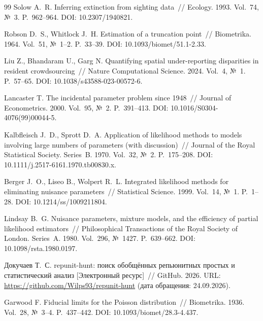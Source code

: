 \documentclass[11pt,a4paper]{article}
\theoremstyle{plain}
\theoremstyle{remark}
\begin{document}
\begin{thebibliography}{99}
 Solow A.~R. Inferring extinction from sighting data~//
Ecology. 1993. Vol.~74, №~3. P.~962--964. DOI: 10.2307/1940821.

 Robson D.~S., Whitlock J.~H. Estimation of a
truncation point~// Biometrika. 1964. Vol.~51, №~1--2. P.~33--39.
DOI: 10.1093/biomet/51.1-2.33.

 Liu Z., Bhandaram U., Garg N. Quantifying spatial
under-reporting disparities in resident crowdsourcing~// Nature Computational
Science. 2024. Vol.~4, №~1. P.~57--65. DOI: 10.1038/s43588-023-00572-6.

 Lancaster T. The incidental parameter problem since
1948~// Journal of Econometrics. 2000. Vol.~95, №~2. P.~391--413.
DOI: 10.1016/S0304-4076(99)00044-5.

 Kalbfleisch J.~D., Sprott D.~A. Application of
likelihood methods to models involving large numbers of parameters (with
discussion)~// Journal of the Royal Statistical Society. Series~B. 1970.
Vol.~32, №~2. P.~175--208. DOI: 10.1111/j.2517-6161.1970.tb00830.x.

 Berger J.~O., Liseo B., Wolpert R.~L. Integrated
likelihood methods for eliminating nuisance parameters~// Statistical Science.
1999. Vol.~14, №~1. P.~1--28. DOI: 10.1214/ss/1009211804.

 Lindsay B.~G. Nuisance parameters, mixture models, and
the efficiency of partial likelihood estimators~// Philosophical Transactions
of the Royal Society of London. Series~A. 1980. Vol.~296, №~1427. P.~639--662.
DOI: 10.1098/rsta.1980.0197.

 Докучаев Т.~С. repunit-hunt: поиск обобщённых репьюнитных
простых и статистический анализ [Электронный ресурс]~// GitHub. 2026.
URL: \url{https://github.com/Wilps93/repunit-hunt} (дата обращения: 24.09.2026).

 Garwood F. Fiducial limits for the Poisson distribution~//
Biometrika. 1936. Vol.~28, №~3--4. P.~437--442. DOI: 10.1093/biomet/28.3-4.437.

\end{thebibliography}
\end{document}
